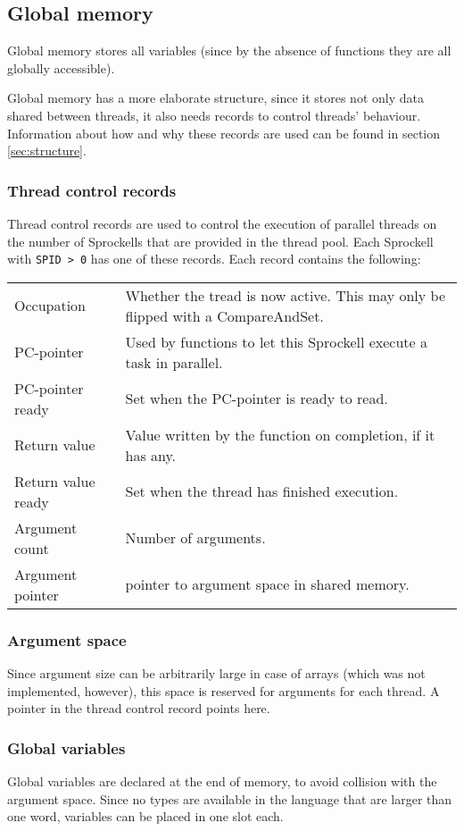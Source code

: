 \documentclass[10pt,a4paper]{report}
\begin{document}
\subsection{Global memory}
Global memory stores all variables (since by the absence of functions they are all globally accessible).

Global memory has a more elaborate structure, since it stores not only data shared between threads, it also needs records to control threads' behaviour. Information about how and why these records are used can be found in section \ref{sec:structure}. 

\subsubsection{Thread control records}
Thread control records are used to control the execution of parallel threads on the number of Sprockells that are provided in the thread pool. Each Sprockell with \texttt{SPID > 0} has one of these records. Each record contains the following:

\begin{tabular}{| l | l |}
\hline
Occupation 
	& Whether the tread is now active. This may only be flipped with a CompareAndSet. \\
PC-pointer 
	& Used by functions to let this Sprockell execute a task in parallel. \\
PC-pointer ready 
	& Set when the PC-pointer is ready to read. \\
Return value 
	& Value written by the function on completion, if it has any. \\
Return value ready 
	& Set when the thread has finished execution. \\
Argument count 
	& Number of arguments. \\
Argument pointer 
	& pointer to argument space in shared memory. \\ 
\hline
\end{tabular}

\subsubsection{Argument space}
Since argument size can be arbitrarily large in case of arrays (which was not implemented, however), this space is reserved for arguments for each thread. A pointer in the thread control record points here.
       
\subsubsection{Global variables}
Global variables are declared at the end of memory, to avoid collision with the argument space. Since no types are available in the language that are larger than one word, variables can be placed in one slot each.
\end{document}
